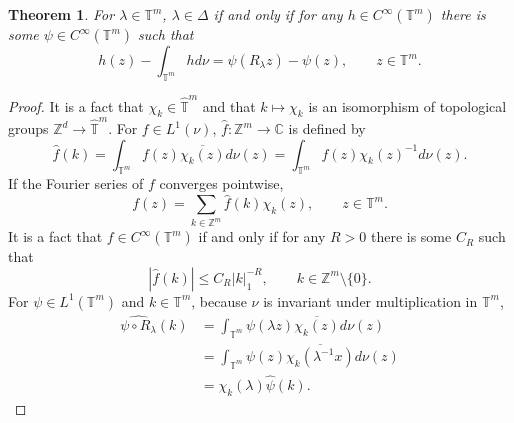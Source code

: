 \documentclass{article}
\newtheorem{theorem}{Theorem}
\theoremstyle{definition}
\begin{document}
\begin{theorem}
For $\lambda \in \mathbb{T}^m$,
$\lambda \in \Delta$ if and only if for any
$h \in C^\infty(\mathbb{T}^m)$ there is some $\psi \in C^\infty(\mathbb{T}^m)$ such that
\begin{equation}
h(z) - \int_{\mathbb{T}^m} h d\nu = \psi(R_\lambda z) - \psi(z),\qquad z \in \mathbb{T}^m.
\label{cohomology}
\end{equation}
\end{theorem}
\begin{proof}
It is a fact that $\chi_k \in \widehat{\mathbb{T}}^m$ and that
$k \mapsto \chi_k$ is an isomorphism of topological groups $\mathbb{Z}^d \to \widehat{\mathbb{T}}^m$. 
For $f \in L^1(\nu)$,
$\widehat{f}:\mathbb{Z}^m \to \mathbb{C}$ is defined by
\[
\widehat{f}(k) = \int_{\mathbb{T}^m} f(z) \overline{\chi_k(z)} d\nu(z)
= \int_{\mathbb{T}^m} f(z) \chi_k(z)^{-1} d\nu(z).
\] 
If the Fourier series of $f$ converges pointwise,
\[
f(z) = \sum_{k \in \mathbb{Z}^m} \widehat{f}(k) \chi_k(z),\qquad z \in \mathbb{T}^m.
\]
It is a fact that $f \in C^\infty(\mathbb{T}^m)$ if and only if
for any $R>0$ there is some $C_R$ such that 
\[
|\widehat{f}(k)| \leq C_R |k|_1^{-R},\qquad k \in \mathbb{Z}^m \setminus \{0\}.
\]
For $\psi \in L^1(\mathbb{T}^m)$ and $k \in \mathbb{T}^m$,
because $\nu$ is invariant under multiplication in $\mathbb{T}^m$,
\begin{align*}
\widehat{\psi \circ R_\lambda}(k)
&=\int_{\mathbb{T}^m} \psi(\lambda z)  \overline{\chi_k(z)} d\nu(z)\\
&=\int_{\mathbb{T}^m} \psi(z) \overline{\chi_k(\lambda^{-1}x)} d\nu(z)\\
&=\chi_k(\lambda) \widehat{\psi}(k).
\end{align*}



\end{proof}
\end{document}

